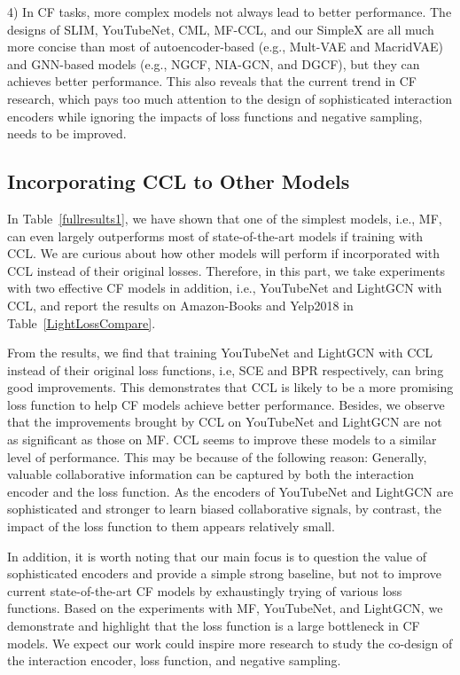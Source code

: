 \documentclass[sigconf,authorversion]{acmart}
\begin{document}
4) In CF tasks, more complex models not always lead to better performance. The designs of SLIM, YouTubeNet, CML, MF-CCL, and our SimpleX are all much more concise than most of autoencoder-based (e.g., Mult-VAE and MacridVAE) and GNN-based models (e.g., NGCF, NIA-GCN, and DGCF), but they can achieves better performance. This also reveals that the current trend in CF research, which pays too much attention to the design of sophisticated interaction encoders while ignoring the impacts of loss functions and negative sampling, needs to be improved.    

 



 




\subsection{Incorporating CCL to Other Models}
In Table~\ref{fullresults1}, we have shown that one of the simplest models, i.e., MF, can even largely outperforms most of state-of-the-art models if training with CCL. We are curious about how other models will perform if incorporated with CCL instead of their original losses. 
Therefore, in this part, we take experiments with two effective CF models in addition, i.e., YouTubeNet and LightGCN with CCL, and report the results on Amazon-Books and Yelp2018 in Table~\ref{LightLossCompare}.




From the results, we find that training YouTubeNet and LightGCN with CCL instead of their original loss functions, i.e, SCE and BPR respectively, can bring good improvements. This demonstrates that CCL is likely to be a more promising loss function to help CF models achieve better performance.
Besides, we observe that the improvements brought by CCL on YouTubeNet and LightGCN are not as significant as those on MF. CCL seems to improve these models to a similar level of performance. 
This may be because of the following reason:
Generally, valuable collaborative information can be captured by both the interaction encoder and the loss function. As the encoders of YouTubeNet and LightGCN are sophisticated and stronger to learn biased collaborative signals, by contrast, the impact of the loss function to them appears relatively small.

In addition, it is worth noting that our main focus is to question the value of sophisticated encoders and provide a simple strong baseline, but not to improve current state-of-the-art CF models by exhaustingly trying of various loss functions.
Based on the experiments with MF, YouTubeNet, and LightGCN, we demonstrate and highlight that the loss function is a large bottleneck in CF models. We expect our work could inspire more research to study the co-design of the interaction encoder, loss function, and negative sampling.
\end{document}
